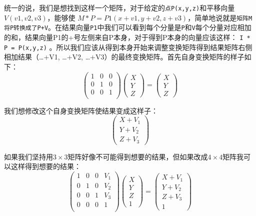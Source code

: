 \documentclass[UTF8,a4paper,12pt]{ctexbook}
\begin{document}
		统一的说，我们是想找到这样一个矩阵，对于给定的\verb|点P(x,y,z)|和平移向量$V(v1,v2,v3)$，能够使 $M * P = P1(x+v1, y+v2, z+v3) $，简单地说就是\verb|矩阵M将P转换成了P+V|。在结果向量\verb|P1|中我们可以看到每个分量是\verb|P|和\verb|V|每个分量对应相加的和，结果向量P1的+号左侧来自P本身，对于得到P本身的向量应该这样： 
		\verb|I * P = P(x,y,z)| 。所以我们应该从得到本身开始来调整变换矩阵得到结果矩阵右侧相加结果（…+V1, …+V2, …+V3）的最终变换矩阵。首先自身变换矩阵的样子如下：
			\begin{equation}
			 \left(
			\begin{array}{ccc}
			1 & 0 & 0\\
			
			0 & 1 & 0\\
			
			0 & 0 & 1\\
			\end{array}
			\right)
			\left(
			\begin{array}{c}
				X\\ 
				Y\\
				Z 
			\end{array}	
			\right) 
			=
			\left(
				\begin{array}{c}
				X\\ 
				Y\\
				Z 
				\end{array}	
			\right)
		\end{equation}
		
		我们想修改这个自身变换矩阵使结果变成这样子：
			$$
				\left(
				\begin{array}{c}
				X+V_1\\ 
				Y+V_2\\
				Z+V_3 
				\end{array}	
				\right)
			$$
		
		如果我们坚持用$3\times3$矩阵好像不可能得到想要的结果，但如果改成$4\times4$矩阵我可以这样得到想要的结果：
			\begin{equation}
			\left(
			\begin{array}{cccc}
			1 & 0 & 0& V_1\\
			
			0 & 1 & 0& V_2\\
			
			0 & 0 & 1& V_3\\
			
			0 & 0 & 0& 1\\
			\end{array}
			\right)
			\left(
			\begin{array}{c}
			X\\ 
			Y\\
			Z\\
			1 
			\end{array}	
			\right) 
			=
			\left(
			\begin{array}{c}
			X+V_1\\ 
			Y+V_2\\
			Z+V_3\\
			1 
			\end{array}	
			\right)
			\end{equation}
		
\end{document}
